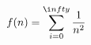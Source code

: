 \documentclass[preview]{standalone}
\begin{document}
\begin{align*}
f( n ) = \sum_{i=0}^{\i n fty}\dfrac{1}{ n ^2}
\end{align*}
\end{document}
